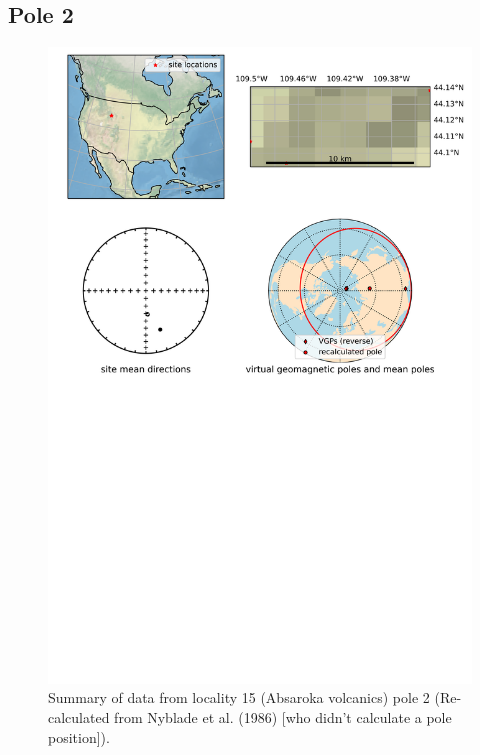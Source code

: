 \subsection{Pole 2}


\begin{figure}[H]
\centering
\includegraphics[width=5 in]{./15/2/pole_summary.png}
\caption{Summary of data from locality 15 (Absaroka volcanics) pole 2 (Re-calculated from Nyblade et al. (1986) [who didn't calculate a pole position]).}
\end{figure}

